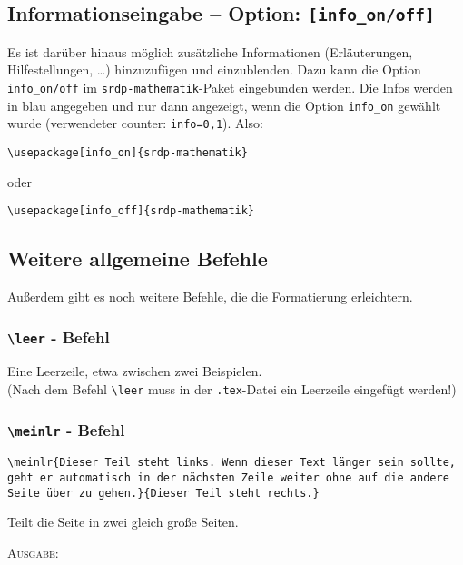 \documentclass[a4paper,12pt]{article}
\begin{document}
\subsection{Informationseingabe -- Option: \texttt{[info\_on/off]}}
Es ist darüber hinaus möglich zusätzliche Informationen (Erläuterungen, Hilfestellungen, \ldots) hinzuzufügen und einzublenden. Dazu kann die Option \texttt{info\_on/off} im \texttt{srdp-mathematik}-Paket eingebunden werden. Die Infos werden in \textcolor[rgb]{0,0,1}{blau} angegeben und nur dann angezeigt, wenn die Option \texttt{info\_on} gewählt wurde (verwendeter counter: \texttt{info=0,1}). Also:


\begin{verbatim}
\usepackage[info_on]{srdp-mathematik}
\end{verbatim}

oder

\begin{verbatim}
\usepackage[info_off]{srdp-mathematik}
\end{verbatim}

				
\subsection{Weitere allgemeine Befehle}
Außerdem gibt es noch weitere Befehle, die die Formatierung erleichtern. 

\subsubsection*{\texttt{\textbackslash leer} - Befehl}
Eine Leerzeile, etwa zwischen zwei Beispielen. \\
(Nach dem Befehl \texttt{\textbackslash leer} muss in der \texttt{.tex}-Datei ein Leerzeile eingefügt werden!) 

\leer

\subsubsection*{\texttt{\textbackslash meinlr} - Befehl}
\begin{verbatim}
\meinlr{Dieser Teil steht links. Wenn dieser Text länger sein sollte, 
geht er automatisch in der nächsten Zeile weiter ohne auf die andere 
Seite über zu gehen.}{Dieser Teil steht rechts.}
\end{verbatim}
Teilt die Seite in zwei gleich große Seiten. 

\leer

\textsc{Ausgabe:}
\end{document}
